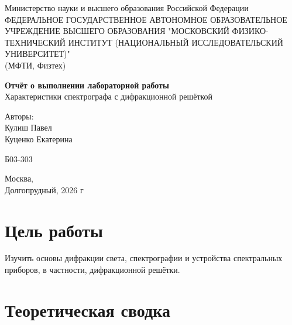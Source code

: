 \documentclass[12pt,a5paper,titlepage, main = russian]{article}
\begin{document}
\begin{titlepage}
\begin{center}
    \small{Министерство науки и высшего образования Российской Федерации}\\
    ФЕДЕРАЛЬНОЕ ГОСУДАРСТВЕННОЕ АВТОНОМНОЕ ОБРАЗОВАТЕЛЬНОЕ УЧРЕЖДЕНИЕ ВЫСШЕГО ОБРАЗОВАНИЯ "МОСКОВСКИЙ ФИЗИКО-ТЕХНИЧЕСКИЙ ИНСТИТУТ (НАЦИОНАЛЬНЫЙ ИССЛЕДОВАТЕЛЬСКИЙ УНИВЕРСИТЕТ)"\\
    (МФТИ, Физтех)
\end{center}
\vspace{2.5cm}
{\huge
    \begin{center}
        {\bf Отчёт о выполнении лабораторной работы}\\
        Характеристики спектрографа с дифракционной решёткой
    \end{center}
}
\vspace{1.5cm}
\begin{flushright}
    {\large Авторы:\\  
Кулиш Павел \\
Куценко Екатерина \\
        \vspace{0.2cm}
        
        Б03-303}
\end{flushright}
\vspace{0.3cm}
\begin{center}
        Москва, \\
        Долгопрудный, 2026 г
\end{center}

\end{titlepage}


\tableofcontents
\newpage

\section{Цель работы}
Изучить основы дифракции света, спектрографии и устройства спектральных приборов, в частности, дифракционной решётки. 

\section{Теоретическая сводка}
\end{document}
